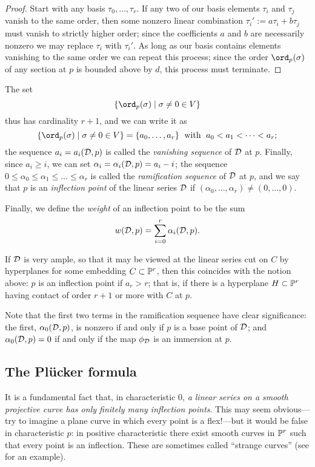 \begin{proof} Start with any basis $\tau_0, \dots, \tau_r$. If any two of our basis elements  $\tau_i$ and $\tau_j$ vanish to the same order, then some nonzero linear combination $\tau_i' := a\tau_i+b\tau_j$ must vanish to strictly higher order; since the coefficients $a$ and $b$ are necessarily nonzero we may replace $\tau_i$ with $\tau_i'$. As long as our basis contains elements vanishing to the same order we can repeat this process; since the order $\ord_p(\sigma)$ of any section at $p$ is bounded above by $d$, this process must terminate.
\end{proof}

The set
$$
\{ \ord_p(\sigma) \mid \sigma \neq 0 \in V \}
$$
thus has cardinality $r+1$, and we can write it as
$$
\{ \ord_p(\sigma) \mid \sigma \neq 0 \in V \} = \{a_0,\dots,a_r\} \; \text{ with } \; a_0 < a_1 < \dots < a_r;
$$
the sequence $a_i = a_i(\cD,p)$ is called the \emph{vanishing sequence} of $\cD$ at $p$.  Finally, since $a_i \geq i$, we can set $\alpha_i = \alpha_i(\cD,p) = a_i - i$; the sequence $0 \leq \alpha_0 \leq \alpha_1 \leq \dots \leq \alpha_r$ is called the \emph{ramification sequence} of $\cD$ at $p$, and we say that $p$ is an \emph{inflection point} of the linear series $\cD$ if $(\alpha_0,\dots,\alpha_r) \neq (0,\dots,0)$. 

Finally, we define the \emph{weight} of an inflection point to be the sum
$$
w(\cD, p) = \sum_{i=0}^r \alpha_i(\cD, p).
$$

If $\cD$ is very ample, so that it may be viewed at the linear series cut on $C$ by hyperplanes for some embedding $C \subset \PP^r$, then this coincides with the notion above: $p$ is an inflection point if $a_r > r$; that is, if there is a hyperplane $H \subset \PP^r$ having contact of order $r+1$ or more with $C$ at $p$.

Note that the first two terms in the ramification sequence have clear significance: the first, $\alpha_0(\cD, p)$, is nonzero if and only if $p$ is a base point of $\cD$; and $\alpha_0(\cD, p) = 0$ if and only if the map $\phi_\cD$ is an immersion at $p$.


\subsection{The Pl\"ucker formula}

It is a fundamental fact that, in characteristic 0, \emph{a linear series on a smooth projective curve has only finitely many inflection points}. This may seem obvious---try to imagine a plane curve in which every point is a flex!---but it would be false in characteristic $p$: in positive characteristic there exist smooth curves in $\PP^r$ such that every point is an inflection. These are sometimes called ``strange curves'' (see \cite[]{Hartshorne} for an example). 

